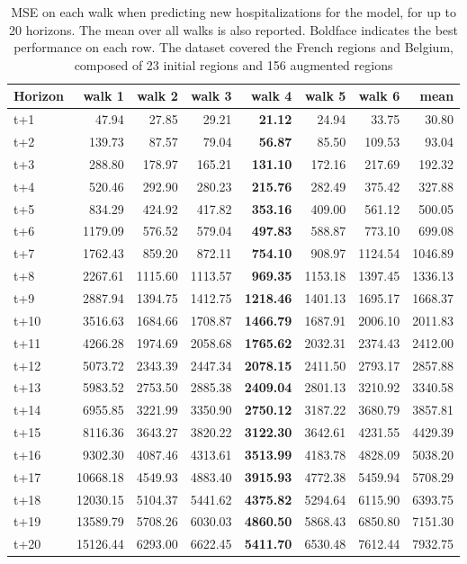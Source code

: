 \begin{table}[H]
\centering
\caption{MSE on each walk when predicting new hospitalizations for the model, for up to 20 horizons. The mean over all walks is also reported. Boldface indicates the best performance on each row. The dataset covered the French regions and Belgium, composed of 23 initial regions and 156 augmented regions }
\label{tab:MSE_walk_custom_linear_regression}
\begin{tabular}{lrrrrrrr}
\toprule
Horizon &   walk 1 &  walk 2 &  walk 3 &  walk 4 &  walk 5 &  walk 6 &    mean \\
\midrule
t+1  & 47.94  & 27.85  & 29.21  & \textbf{21.12}  & 24.94  & 33.75  & 30.80  \\
t+2  & 139.73  & 87.57  & 79.04  & \textbf{56.87}  & 85.50  & 109.53  & 93.04  \\
t+3  & 288.80  & 178.97  & 165.21  & \textbf{131.10}  & 172.16  & 217.69  & 192.32  \\
t+4  & 520.46  & 292.90  & 280.23  & \textbf{215.76}  & 282.49  & 375.42  & 327.88  \\
t+5  & 834.29  & 424.92  & 417.82  & \textbf{353.16}  & 409.00  & 561.12  & 500.05  \\
t+6  & 1179.09  & 576.52  & 579.04  & \textbf{497.83}  & 588.87  & 773.10  & 699.08  \\
t+7  & 1762.43  & 859.20  & 872.11  & \textbf{754.10}  & 908.97  & 1124.54  & 1046.89  \\
t+8  & 2267.61  & 1115.60  & 1113.57  & \textbf{969.35}  & 1153.18  & 1397.45  & 1336.13  \\
t+9  & 2887.94  & 1394.75  & 1412.75  & \textbf{1218.46}  & 1401.13  & 1695.17  & 1668.37  \\
t+10  & 3516.63  & 1684.66  & 1708.87  & \textbf{1466.79}  & 1687.91  & 2006.10  & 2011.83  \\
t+11  & 4266.28  & 1974.69  & 2058.68  & \textbf{1765.62}  & 2032.31  & 2374.43  & 2412.00  \\
t+12  & 5073.72  & 2343.39  & 2447.34  & \textbf{2078.15}  & 2411.50  & 2793.17  & 2857.88  \\
t+13  & 5983.52  & 2753.50  & 2885.38  & \textbf{2409.04}  & 2801.13  & 3210.92  & 3340.58  \\
t+14  & 6955.85  & 3221.99  & 3350.90  & \textbf{2750.12}  & 3187.22  & 3680.79  & 3857.81  \\
t+15  & 8116.36  & 3643.27  & 3820.22  & \textbf{3122.30}  & 3642.61  & 4231.55  & 4429.39  \\
t+16  & 9302.30  & 4087.46  & 4313.61  & \textbf{3513.99}  & 4183.78  & 4828.09  & 5038.20  \\
t+17  & 10668.18  & 4549.93  & 4883.40  & \textbf{3915.93}  & 4772.38  & 5459.94  & 5708.29  \\
t+18  & 12030.15  & 5104.37  & 5441.62  & \textbf{4375.82}  & 5294.64  & 6115.90  & 6393.75  \\
t+19  & 13589.79  & 5708.26  & 6030.03  & \textbf{4860.50}  & 5868.43  & 6850.80  & 7151.30  \\
t+20  & 15126.44  & 6293.00  & 6622.45  & \textbf{5411.70}  & 6530.48  & 7612.44  & 7932.75  \\


\end{tabular}
\end{table}
